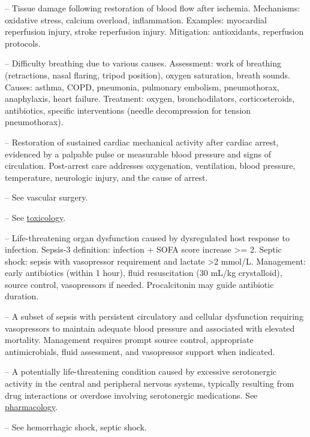 -- Tissue damage following restoration of blood flow after ischemia. Mechanisms: oxidative stress, calcium overload, inflammation. Examples: myocardial reperfusion injury, stroke reperfusion injury. Mitigation: antioxidants, reperfusion protocols.

-- Difficulty breathing due to various causes. Assessment: work of breathing (retractions, nasal flaring, tripod position), oxygen saturation, breath sounds. Causes: asthma, COPD, pneumonia, pulmonary embolism, pneumothorax, anaphylaxis, heart failure. Treatment: oxygen, bronchodilators, corticosteroids, antibiotics, specific interventions (needle decompression for tension pneumothorax).

-- Restoration of sustained cardiac mechanical activity after cardiac arrest, evidenced by a palpable pulse or measurable blood pressure and signs of circulation. Post-arrest care addresses oxygenation, ventilation, blood pressure, temperature, neurologic injury, and the cause of arrest.

-- See vascular surgery.

-- See \hyperlink{Toxicology}{toxicology}.

-- Life-threatening organ dysfunction caused by dysregulated host response to infection. Sepsis-3 definition: infection + SOFA score increase >= 2. Septic shock: sepsis with vasopressor requirement and lactate >2 mmol/L. Management: early antibiotics (within 1 hour), fluid resuscitation (30 mL/kg crystalloid), source control, vasopressors if needed. Procalcitonin may guide antibiotic duration.

-- A subset of sepsis with persistent circulatory and cellular dysfunction requiring vasopressors to maintain adequate blood pressure and associated with elevated mortality. Management requires prompt source control, appropriate antimicrobials, fluid assessment, and vasopressor support when indicated.

-- A potentially life-threatening condition caused by excessive serotonergic activity in the central and peripheral nervous systems, typically resulting from drug interactions or overdose involving serotonergic medications. See \hyperlink{Pharmacology}{pharmacology}.

-- See hemorrhagic shock, septic shock.

